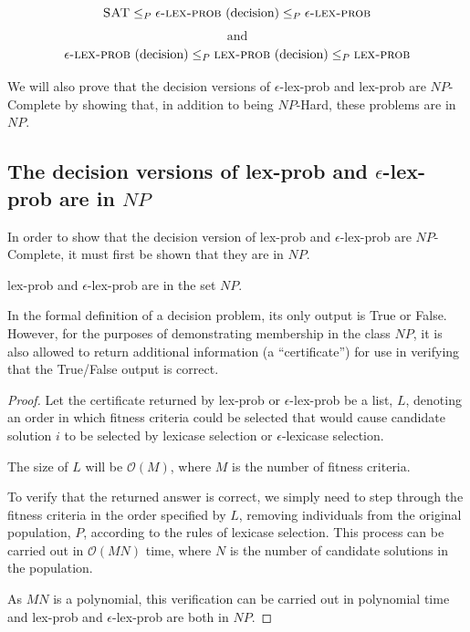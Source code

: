 \documentclass[sigconf]{acmart}
\begin{document}
\[
\text{{\sc SAT}} \leq_{P} \text{{\sc $\epsilon$-lex-prob} (decision)} \leq_{P} \text{{\sc $\epsilon$-lex-prob}}
\]
\[
\text{and}
\]
\[
\text{{\sc $\epsilon$-lex-prob} (decision)} \leq_{P} \text{{\sc lex-prob} (decision)} \leq_{P} \text{{\sc lex-prob}}
\]

We will also prove that the decision versions of {\sc $\epsilon$-lex-prob} and {\sc lex-prob} are $NP$-Complete by showing that, in addition to being $NP$-Hard, these problems are in $NP$.

\subsection{The decision versions of {\sc lex-prob} and {\sc $\epsilon$-lex-prob} are in $NP$}

In order to show that the decision version of {\sc lex-prob} and {\sc $\epsilon$-lex-prob} are $NP$-Complete, it must first be shown that they are in $NP$.

\begin{theorem}
\label{np_theorem}
{\sc lex-prob} and {\sc $\epsilon$-lex-prob} are in the set $NP$.
\end{theorem}

In the formal definition of a decision problem, its only output is True or False. However, for the purposes of demonstrating membership in the class $NP$, it is also allowed to return additional information (a ``certificate'') for use in verifying that the True/False output is correct. 

\begin{proof}
    Let the certificate returned by {\sc lex-prob} or {\sc $\epsilon$-lex-prob} be a list, $L$, denoting an order in which fitness criteria could be selected that would cause candidate solution $i$ to be selected by lexicase selection or $\epsilon$-lexicase selection.

    The size of $L$ will be $\mathcal{O}(M)$, where $M$ is the number of fitness criteria.

    To verify that the returned answer is correct, we simply need to step through the fitness criteria in the order specified by $L$, removing individuals from the original population, $P$, according to the rules of lexicase selection. This process can be carried out in $\mathcal{O}(MN)$ time, where $N$ is the number of candidate solutions in the population.

    As $MN$ is a polynomial, this verification can be carried out in polynomial time and {\sc lex-prob} and {\sc $\epsilon$-lex-prob} are both in $NP$.
\end{proof}
\end{document}
